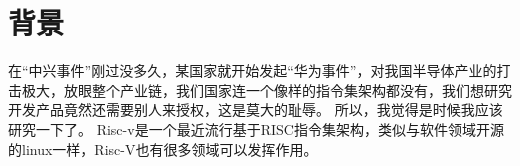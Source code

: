 \section{背景}
在“中兴事件”刚过没多久，某国家就开始发起“华为事件”，对我国半导体产业的打击极大，放眼整个产业链，我们国家连一个像样的指令集架构都没有，我们想研究开发产品竟然还需要别人来授权，这是莫大的耻辱。
所以，我觉得是时候我应该研究一下了。
Risc-v是一个最近流行基于RISC指令集架构，类似与软件领域开源的linux一样，Risc-V也有很多领域可以发挥作用。

